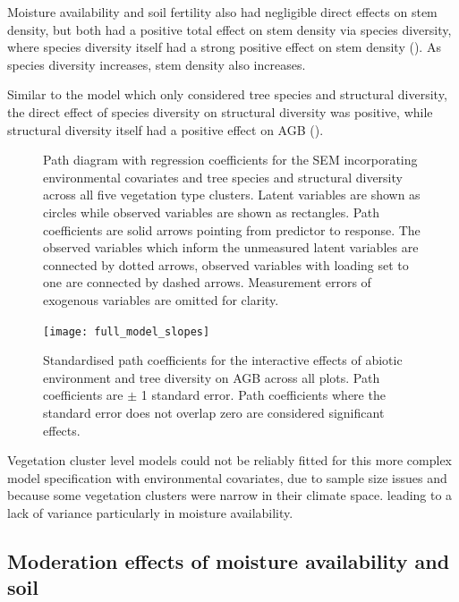 \documentclass[11pt,a4paper]{article}
\begin{document}
Moisture availability and soil fertility also had negligible direct effects on stem density, but both had a positive total effect on stem density via species diversity, where species diversity itself had a strong positive effect on stem density (\rgid{}). As species diversity increases, stem density also increases. 

Similar to the model which only considered tree species and structural diversity, the direct effect of species diversity on structural diversity was positive, while structural diversity itself had a positive effect on AGB (\rghb{}). 

\begin{figure}[H]
\centering
	
	\caption{Path diagram with regression coefficients for the SEM incorporating environmental covariates and tree species and structural diversity across all five vegetation type clusters. Latent variables are shown as circles while observed variables are shown as rectangles. Path coefficients are solid arrows pointing from predictor to response. The observed variables which inform the unmeasured latent variables are connected by dotted arrows, observed variables with loading set to one are connected by dashed arrows. Measurement errors of exogenous variables are omitted for clarity.}
	\label{full_mod}
\end{figure}

\begin{figure}[H]
\centering
	\texttt{[image: full\_model\_slopes]}
	\caption{Standardised path coefficients for the interactive effects of abiotic environment and tree diversity on AGB across all plots. Path coefficients are $\pm$ 1 standard error. Path coefficients where the standard error does not overlap zero are considered significant effects.}
	\label{full_model_slopes}
\end{figure}


Vegetation cluster level models could not be reliably fitted for this more complex model specification with environmental covariates, due to sample size issues and because some vegetation clusters were narrow in their climate space. leading to a lack of variance particularly in moisture availability.

\subsection{Moderation effects of moisture availability and soil}
\end{document}

